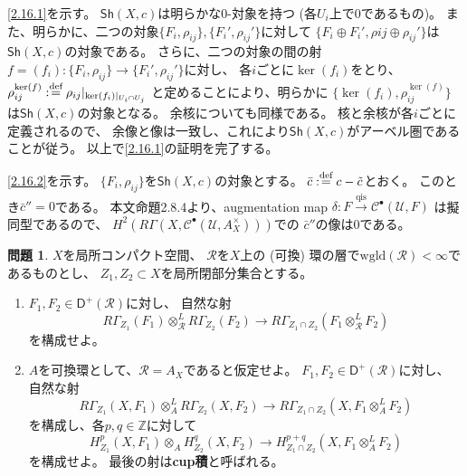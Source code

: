 \documentclass[uplatex,dvipdfmx]{jsarticle}
\makeatletter
\theoremstyle{definition}
\newtheorem{prob}[prob]{問題}
\renewenvironment{proof}[1][\proofname]{
  \pushQED{\qed}%
  \normalfont \topsep6\p@\@plus6\p@\relax
  \trivlist
  \item[\hskip\labelsep
    #1\@addpunct{\textbf{.}}]\ignorespaces
}{%
  \popQED\endtrivlist\@endpefalse
}
\providecommand{\proofname}{証明}
\newcommand{\Sh}{\mathsf{Sh}}
\newcommand{\sfD}{\mathsf{D}}
\newcommand\Z{\mathbb{Z}}
\newcommand\mcC{\mathcal{C}}
\newcommand\mcR{\mathcal{R}}
\newcommand\mcU{\mathcal{U}}
\newcommand{\wgld}{\mathrm{wgld}}
\def\dfn{:\overset{\mbox{{\scriptsize def}}}{=}}
\makeatother
\begin{document}
\begin{proof}
  \ref{2.16.1}を示す。
  \(\Sh(X,c)\)は明らかな\(0\)-対象を持つ
  (各\(U_i\)上で\(0\)であるもの)。
  また、明らかに、二つの対象\(\{F_i,\rho_{ij}\},\{F_i',\rho_{ij}'\}\)に対して
  \(\{F_i\oplus F_i',\rho{ij}\oplus \rho_{ij}'\}\)は\(\Sh(X,c)\)の対象である。
  さらに、二つの対象の間の射\(f=(f_i):\{F_i,\rho_{ij}\}\to\{F_i',\rho_{ij}'\}\)に対し、
  各\(i\)ごとに\(\ker(f_i)\)をとり、
  \(\rho^{\ker(f)}_{ij}\dfn \rho_{ij}|_{\ker(f_i)|_{U_i\cap U_j}}\)
  と定めることにより、明らかに
  \(\{\ker(f_i),\rho^{\ker(f)}_{ij}\}\)は\(\Sh(X,c)\)の対象となる。
  余核についても同様である。
  核と余核が各\(i\)ごとに定義されるので、
  余像と像は一致し、これにより\(\Sh(X,c)\)がアーベル圏であることが従う。
  以上で\ref{2.16.1}の証明を完了する。

  \ref{2.16.2}を示す。
  \(\{F_i,\rho_{ij}\}\)を\(\Sh(X,c)\)の対象とする。
  \(\bar{c} \dfn c-\tilde{c}\)とおく。
  このとき\(\bar{c}''=0\)である。
  本文命題2.8.4より、augmentation map
  \(\delta:F\xrightarrow{\text{qis}} \mcC^{\bullet}(\mcU,F)\)
  は擬同型であるので、
  \(H^2(R\Gamma(X,\mcC^{\bullet}(\mcU,A_X^{\times})))\)での
  \(\bar{c}''\)の像は\(0\)である。
\end{proof}





\begin{prob}\label{2.17}
  \(X\)を局所コンパクト空間、
  \(\mcR\)を\(X\)上の (可換) 環の層で\(\wgld(\mcR)<\infty\)であるものとし、
  \(Z_1,Z_2\subset X\)を局所閉部分集合とする。
  \begin{enumerate}
    \item \label{2.17.1}
    \(F_1,F_2\in \sfD^+(\mcR)\)に対し、
    自然な射
    \[
    R\Gamma_{Z_1}(F_1)\otimes_{\mcR}^L R\Gamma_{Z_2}(F_2)
    \to R\Gamma_{Z_1\cap Z_2}(F_1\otimes_{\mcR}^L F_2)
    \]
    を構成せよ。
    \item \label{2.17.2}
    \(A\)を可換環として、\(\mcR=A_X\)であると仮定せよ。
    \(F_1,F_2\in \sfD^+(\mcR)\)に対し、
    自然な射
    \[
    R\Gamma_{Z_1}(X,F_1)\otimes_A^L R\Gamma_{Z_2}(X,F_2)
    \to R\Gamma_{Z_1\cap Z_2}(X,F_1\otimes_A^L F_2)
    \]
    を構成し、各\(p,q\in \Z\)に対して
    \[
    H^p_{Z_1}(X,F_1)\otimes_A H^q_{Z_2}(X,F_2)
    \to H^{p+q}_{Z_1\cap Z_2}(X,F_1\otimes_A^L F_2)
    \]
    を構成せよ。
    最後の射は\textbf{cup積}と呼ばれる。
  \end{enumerate}
\end{prob}
\end{document}
